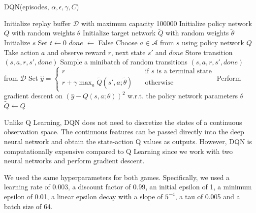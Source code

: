 \documentclass{article}
\begin{document}
\begin{algorithm}[H]
      \caption{DQN(episodes, \(\alpha, \epsilon, \gamma, C\))}
      \label{alg:dqn}
      \begin{algorithmic}[1]
            \State Initialize replay buffer \(\mathcal{D}\) with maximum capacity 100000
            \State Initialize policy network \(Q\) with random weights \(\theta\)
            \State Initialize target network \(\tilde{Q}\) with random weights \(\tilde{\theta}\) 
            \State Initialize \(s\)
            \State Set \(t \leftarrow 0\) 
            \State \(done\) \(\leftarrow\) False
            \State Choose \(a \in \mathcal{A}\) from \(s\) using policy network \(Q\) 
            \State Take action \(a\) and observe reward \(r\), next state \(s'\) and \(done\)
            \State Store transition \((s, a, r, s', done)\)
            \State Sample a minibatch of random transitions \((s, a, r, s', done)\) from \(\mathcal{D}\)
            \State Set \(\hat{y} =
            \begin{cases}
                  r                                                  & \quad \text{if }s \text{ is a terminal state} \\
                  r + \gamma \max_a \tilde{Q}(s', a; \tilde{\theta}) & \quad \text{otherwise}
            \end{cases}\) 
            \State Perform gradient descent on \(\left(\hat{y} - Q(s, a; \theta)\right)^2\) w.r.t. the policy network parameters \(\theta\)
            \State \(\tilde{Q} \leftarrow Q\) 
            \EndIf
            \EndWhile
            \EndFor
      \end{algorithmic}
\end{algorithm}

Unlike Q Learning, DQN does not need to discretize the states of a continuous
observation space. The continuous features can be passed directly into the deep
neural network and obtain the state-action Q values as outputs. However, DQN is
computationally expensive compared to Q Learning since we work with two neural
networks and perform gradient descent.

We used the same hyperparameters for both games. Specifically, we used a
learning rate of 0.003, a discount factor of 0.99, an initial epsilon of 1, a
minimum epsilon of 0.01, a linear epsilon decay with a slope of \(5^{-4}\), a
tau of 0.005 and a batch size of 64.
\end{document}
